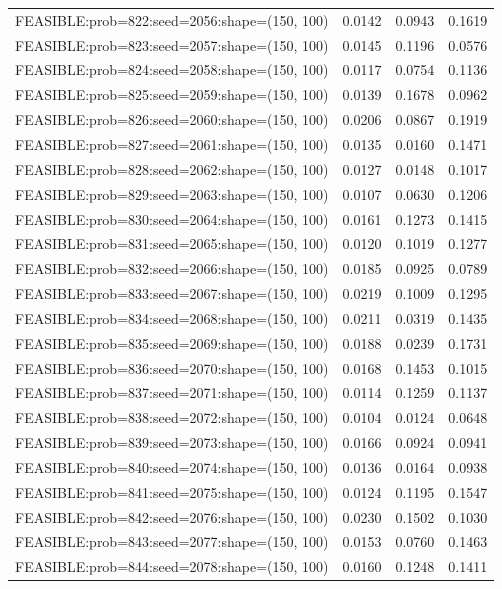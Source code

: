 \begin{longtable}{lccc}
FEASIBLE:prob=822:seed=2056:shape=(150, 100) & 0.0142 & 0.0943 & 0.1619 \\
FEASIBLE:prob=823:seed=2057:shape=(150, 100) & 0.0145 & 0.1196 & 0.0576 \\
FEASIBLE:prob=824:seed=2058:shape=(150, 100) & 0.0117 & 0.0754 & 0.1136 \\
FEASIBLE:prob=825:seed=2059:shape=(150, 100) & 0.0139 & 0.1678 & 0.0962 \\
FEASIBLE:prob=826:seed=2060:shape=(150, 100) & 0.0206 & 0.0867 & 0.1919 \\
FEASIBLE:prob=827:seed=2061:shape=(150, 100) & 0.0135 & 0.0160 & 0.1471 \\
FEASIBLE:prob=828:seed=2062:shape=(150, 100) & 0.0127 & 0.0148 & 0.1017 \\
FEASIBLE:prob=829:seed=2063:shape=(150, 100) & 0.0107 & 0.0630 & 0.1206 \\
FEASIBLE:prob=830:seed=2064:shape=(150, 100) & 0.0161 & 0.1273 & 0.1415 \\
FEASIBLE:prob=831:seed=2065:shape=(150, 100) & 0.0120 & 0.1019 & 0.1277 \\
FEASIBLE:prob=832:seed=2066:shape=(150, 100) & 0.0185 & 0.0925 & 0.0789 \\
FEASIBLE:prob=833:seed=2067:shape=(150, 100) & 0.0219 & 0.1009 & 0.1295 \\
FEASIBLE:prob=834:seed=2068:shape=(150, 100) & 0.0211 & 0.0319 & 0.1435 \\
FEASIBLE:prob=835:seed=2069:shape=(150, 100) & 0.0188 & 0.0239 & 0.1731 \\
FEASIBLE:prob=836:seed=2070:shape=(150, 100) & 0.0168 & 0.1453 & 0.1015 \\
FEASIBLE:prob=837:seed=2071:shape=(150, 100) & 0.0114 & 0.1259 & 0.1137 \\
FEASIBLE:prob=838:seed=2072:shape=(150, 100) & 0.0104 & 0.0124 & 0.0648 \\
FEASIBLE:prob=839:seed=2073:shape=(150, 100) & 0.0166 & 0.0924 & 0.0941 \\
FEASIBLE:prob=840:seed=2074:shape=(150, 100) & 0.0136 & 0.0164 & 0.0938 \\
FEASIBLE:prob=841:seed=2075:shape=(150, 100) & 0.0124 & 0.1195 & 0.1547 \\
FEASIBLE:prob=842:seed=2076:shape=(150, 100) & 0.0230 & 0.1502 & 0.1030 \\
FEASIBLE:prob=843:seed=2077:shape=(150, 100) & 0.0153 & 0.0760 & 0.1463 \\
FEASIBLE:prob=844:seed=2078:shape=(150, 100) & 0.0160 & 0.1248 & 0.1411 \\

\end{longtable}
